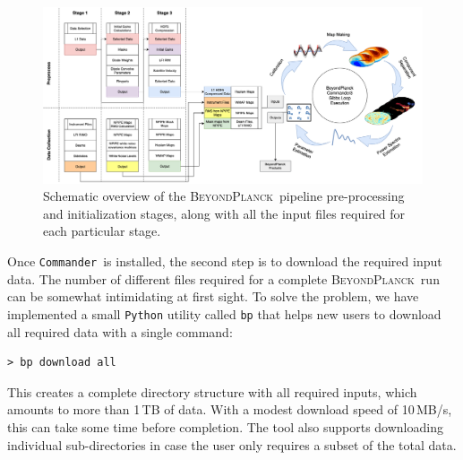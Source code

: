 \documentclass[twocolumn]{aa}
\def\commander{\texttt{Commander}}
\newcommand{\BP}{\textsc{BeyondPlanck}}
\begin{document}
\begin{figure}
      \center
      \includegraphics[width=18.5cm]{figures/bp_pipeline_reworked_v3.png}
      \caption{Schematic overview of the \BP\ pipeline pre-processing
        and initialization stages, along with all the input files
        required for each particular stage.}\label{fig:bp_pipeline_stages}
\end{figure}

Once \commander\ is installed, the second step is to download the required input data. The number of different files required for a complete \BP\ run can be somewhat intimidating at first sight. To solve the problem, we have implemented a small \texttt{Python} utility called \texttt{bp} that helps new users to download all required data with a single command:



\begin{verbatim}
> bp download all
\end{verbatim}
\noindent This creates a complete directory structure with all required inputs, which amounts to more than 1\,TB of data. With a modest download speed of 10\,MB/s, this can take some time before completion. The tool also supports downloading individual sub-directories in case the user only requires a subset of the total data.
\end{document}
